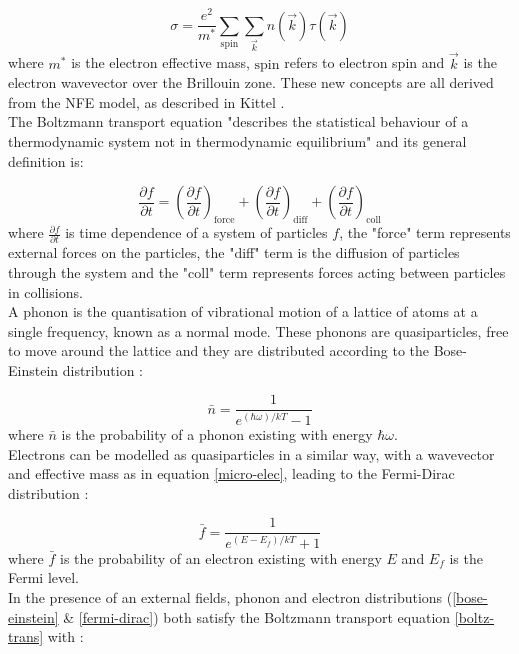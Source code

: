 \documentclass[a4paper,10pt,journal]{IEEEtran}
\begin{document}
\begin{equation}
\label{micro-elec}
	\sigma = \frac{e^2}{m^*} \sum_{\mathrm{spin}} \sum_{\vec{k}}
	n(\vec{k}) \tau(\vec{k})
\end{equation}
where $m^*$ is the electron effective mass, $\mathrm{spin}$ refers to
electron spin and $\vec{k}$ is the electron wavevector over the
Brillouin zone. These new concepts are all derived from the \ac{NFE}
model, as described in Kittel \cite{kittel}.\\
The Boltzmann transport equation "describes the statistical behaviour
of a thermodynamic system not in thermodynamic equilibrium"
\cite{wiki-boltz} and its general definition is:

\begin{equation}
\label{boltz-trans}
	\frac{\partial f}{\partial t} = \left(\frac{\partial f}{\partial
	t}\right)_\mathrm{force} + \left(\frac{\partial f}{\partial t}\right)_\mathrm{diff}+ \left(\frac{\partial f}{\partial t}\right)_\mathrm{coll}
\end{equation}
where $\frac{\partial f}{\partial t}$ is time dependence of a system
of particles $f$, the "force" term represents external forces on the
particles, the "diff" term is the diffusion of particles through the
system and the "coll" term represents forces acting between particles
in collisions.\\
A phonon is the quantisation of vibrational motion of a lattice of
atoms at a single frequency, known as a normal mode. These phonons are
quasiparticles, free to move around the lattice and they are
distributed according to the Bose-Einstein distribution \cite{kittel}:

\begin{equation}
\label{bose-einstein}
	 \bar{n} = \frac{1}{e^{(\hbar \omega) / k T} - 1}
\end{equation}
where $\bar{n}$ is the probability of a phonon existing with energy
$\hbar \omega$.\\
Electrons can be modelled as quasiparticles in a similar way, with a
wavevector and effective mass as in equation \eqref{micro-elec},
leading to the Fermi-Dirac distribution \cite{kittel}:

\begin{equation}
\label{fermi-dirac}
	 \bar{f} = \frac{1}{e^{(E - E_f) / k T} + 1}
\end{equation}
where $\bar{f}$ is the probability of an electron existing with energy
$E$ and $E_f$ is the Fermi level.\\
In the presence of an external fields, phonon and electron
distributions (\eqref{bose-einstein} \& \eqref{fermi-dirac}) both
satisfy the Boltzmann transport equation \eqref{boltz-trans} with
\cite{ziman}:
\end{document}

